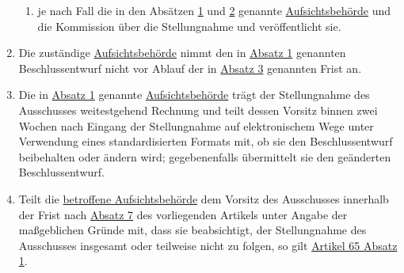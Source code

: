 \begin{enumerate}
\begin{enumerate}
    \item je nach Fall die in den Absätzen \hyperref[itm:64-1]{1} und \hyperref[itm:64-2]{2} genannte \hyperref
     [itm:04-21]{Aufsichtsbehörde} und die Kommission über die Stellungnahme und veröffentlicht sie.
    \label{itm:64-5b}

  \end{enumerate}

  \item Die zuständige \hyperref[itm:04-21]{Aufsichtsbehörde} nimmt den in \hyperref[itm:64-1]{Absatz 1} genannten
   Beschlussentwurf nicht vor Ablauf der in \hyperref[itm:64-3]{Absatz 3} genannten Frist an.
  \label{itm:64-6}

  \item Die in \hyperref[itm:64-1]{Absatz 1} genannte \hyperref[itm:04-21]{Aufsichtsbehörde} trägt der Stellungnahme des
   Ausschusses weitestgehend Rechnung und teilt dessen Vorsitz binnen zwei Wochen nach Eingang der Stellungnahme auf
   elektronischem Wege unter Verwendung eines standardisierten Formats mit, ob sie den Beschlussentwurf beibehalten
   oder ändern wird; gegebenenfalls übermittelt sie den geänderten Beschlussentwurf.
  \label{itm:64-7}

  \item Teilt die \hyperref[itm:04-22]{betroffene Aufsichtsbehörde} dem Vorsitz des Ausschusses innerhalb der Frist
   nach \hyperref[itm:64-7]{Absatz 7} des vorliegenden Artikels unter Angabe der maßgeblichen Gründe mit, dass sie
   beabsichtigt, der Stellungnahme des Ausschusses insgesamt oder teilweise nicht zu folgen, so gilt \hyperref
   [itm:65-2]{Artikel 65 Absatz 1}.
  \label{itm:64-8}

\end{enumerate}


